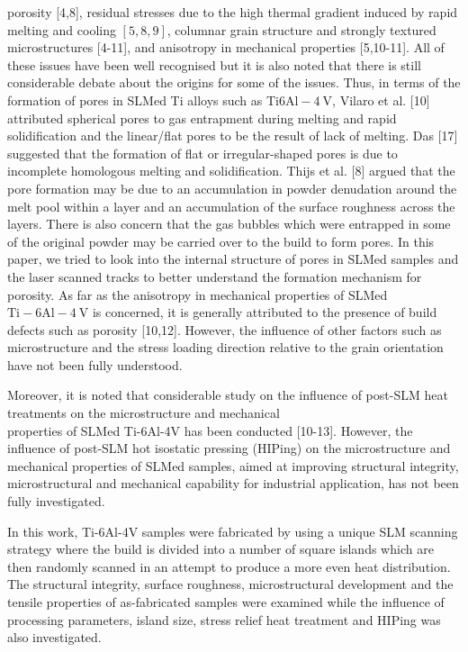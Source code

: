 \documentclass[10pt]{article}
\begin{document}
porosity [4,8], residual stresses due to the high thermal gradient induced by rapid melting and cooling $[5,8,9]$, columnar grain structure and strongly textured microstructures [4-11], and anisotropy in mechanical properties [5,10-11]. All of these issues have been well recognised but it is also noted that there is still considerable debate about the origins for some of the issues. Thus, in terms of the formation of pores in SLMed Ti alloys such as Ti$6 \mathrm{Al}-4 \mathrm{~V}$, Vilaro et al. [10] attributed spherical pores to gas entrapment during melting and rapid solidification and the linear/flat pores to be the result of lack of melting. Das [17] suggested that the formation of flat or irregular-shaped pores is due to incomplete homologous melting and solidification. Thijs et al. [8] argued that the pore formation may be due to an accumulation in powder denudation around the melt pool within a layer and an accumulation of the surface roughness across the layers. There is also concern that the gas bubbles which were entrapped in some of the original powder may be carried over to the build to form pores. In this paper, we tried to look into the internal structure of pores in SLMed samples and the laser scanned tracks to better understand the formation mechanism for porosity. As far as the anisotropy in mechanical properties of SLMed $\mathrm{Ti}-6 \mathrm{Al}-4 \mathrm{~V}$ is concerned, it is generally attributed to the presence of build defects such as porosity [10,12]. However, the influence of other factors such as microstructure and the stress loading direction relative to the grain orientation have not been fully understood.

Moreover, it is noted that considerable study on the influence of post-SLM heat treatments on the microstructure and mechanical\\
properties of SLMed Ti-6Al-4V has been conducted [10-13]. However, the influence of post-SLM hot isostatic pressing (HIPing) on the microstructure and mechanical properties of SLMed samples, aimed at improving structural integrity, microstructural and mechanical capability for industrial application, has not been fully investigated.

In this work, Ti-6Al-4V samples were fabricated by using a unique SLM scanning strategy where the build is divided into a number of square islands which are then randomly scanned in an attempt to produce a more even heat distribution. The structural integrity, surface roughness, microstructural development and the tensile properties of as-fabricated samples were examined while the influence of processing parameters, island size, stress relief heat treatment and HIPing was also investigated.
\end{document}

